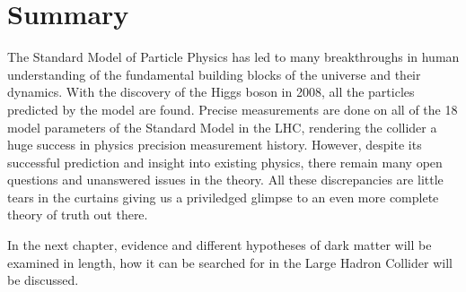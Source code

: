 \section{Summary}
The Standard Model of Particle Physics has led to many breakthroughs in human understanding of the fundamental building blocks of the universe and their dynamics. With the discovery of the Higgs boson in 2008, all the particles predicted by the model are found. Precise measurements are done on all of the 18 model parameters of the Standard Model in the LHC, rendering the collider a huge success in physics precision measurement history. However, despite its successful prediction and insight into
existing physics, there remain many open questions and unanswered issues in the theory. All these discrepancies are little tears in the curtains giving us a priviledged glimpse to an even more complete theory of truth out there.

In the next chapter, evidence and different hypotheses of dark matter will be examined in length, how it can be searched for in the Large Hadron Collider will be discussed. 



%



